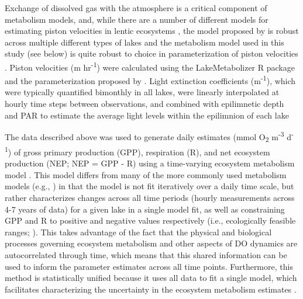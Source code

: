 \documentclass[12pt, oneside]{article}
\begin{document}
Exchange of dissolved gas with the atmosphere is a critical component of metabolism models, and, while there are a number of different models for estimating piston velocities in lentic ecosystems \citep{dugan_consequences_2016}, the model proposed by \citealt{vachon_ecosystem_2013} is robust across multiple different types of lakes \citep{dugan_consequences_2016} and the metabolism model used in this study (see below) is quite robust to choice in parameterization of piston velocities \citep{phillips_timevarying_2020}. Piston velocities (m hr\textsuperscript{-1}) were calculated using the LakeMetabolizer R package \citep{winslow_lakemetabolizer_2016} and the parameterization proposed by \citealt{vachon_ecosystem_2013}. Light extinction coefficients (m\textsuperscript{-1}), which were typically quantified bimonthly in all lakes, were linearly interpolated at hourly time steps between observations, and combined with epilimnetic depth and PAR to estimate the average light levels within the epilimnion of each lake \citep{staehr_lake_2012,phillips_timevarying_2020}

The data described above was used to generate daily estimates (mmol O\textsubscript{2} m\textsuperscript{-3} d\textsuperscript{-1}) of gross primary production (GPP), respiration (R), and net ecosystem production (NEP; NEP = GPP - R) using a time-varying ecosystem metabolism model \citep{phillips_timevarying_2020}. This model differs from many of the more commonly used metabolism models (e.g., \citealt{winslow_lakemetabolizer_2016}) in that the model is not fit iteratively over a daily time scale, but rather characterizes changes across all time periods (hourly measurements across 4-7 years of data) for a given lake in a single model fit, as well as constraining GPP and R to positive and negative values respectively (i.e., ecologically feasible ranges; \citealt{phillips_timevarying_2020}). This takes advantage of the fact that the physical and biological processes governing ecosystem metabolism and other aspects of DO dynamics are autocorrelated through time, which means that this shared information can be used to inform the parameter estimates across all time points. Furthermore, this method is statistically unified because it uses all data to fit a single model, which facilitates characterizing the uncertainty in the ecosystem metabolism estimates \citep{phillips_timevarying_2020}. 
\end{document}
